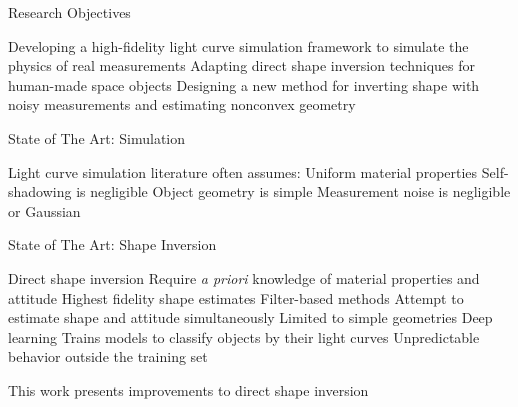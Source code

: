 \documentclass{beamer}
\begin{document}
\begin{frame}{Research Objectives}
    \begin{outline}
        \1 Developing a high-fidelity light curve simulation framework to simulate the physics of real measurements
        \1 Adapting direct shape inversion techniques for human-made space objects
        \1 Designing a new method for inverting shape with noisy measurements and estimating nonconvex geometry
    \end{outline}
\end{frame}

\begin{frame}{State of The Art: Simulation}

    \begin{outline}
        \1 Light curve simulation literature often assumes:
        \2 Uniform material properties
        \2 Self-shadowing is negligible
        \2 Object geometry is simple \cite{cabrera2021}
        \2 Measurement noise is negligible or Gaussian \cite{fan2020thesis}
    \end{outline}
\end{frame}

\begin{frame}{State of The Art: Shape Inversion}

    \begin{outline}
        \1 Direct shape inversion
        \2 Require \textit{a priori} knowledge of material properties and attitude
        \2 Highest fidelity shape estimates
        \1 Filter-based methods
        \2 Attempt to estimate shape and attitude simultaneously
        \2 Limited to simple geometries
        \1 Deep learning
        \2 Trains models to classify objects by their light curves
        \2 Unpredictable behavior outside the training set
    \end{outline}

    This work presents improvements to direct shape inversion
\end{frame}
\end{document}
